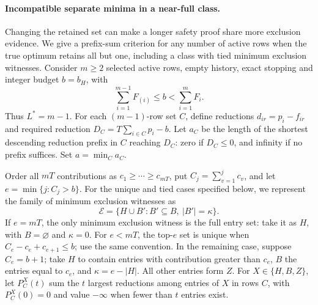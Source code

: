 \paragraph{Incompatible separate minima in a near-full class.}
Changing the retained set can make a longer safety proof share more exclusion evidence. We give a prefix-sum criterion for any number of active rows when the true optimum retains all but one, including a class with tied minimum exclusion witnesses. Consider $m\ge2$ selected active rows, empty history, exact stopping and integer budget $b=b_H$, with
\[
 \sum_{i=1}^{m-1}F_{(i)}\le b<\sum_{i=1}^m F_i.
\]
Thus $L^*=m-1$. For each $(m-1)$-row set $C$, define reductions $d_{ir}=p_i-f_{ir}$ and required reduction $D_C=T\sum_{i\in C}p_i-b$. Let $a_C$ be the length of the shortest descending reduction prefix in $C$ reaching $D_C$: zero if $D_C\le0$, and infinity if no prefix suffices. Set $a=\min_C a_C$.

Order all $mT$ contributions as $c_1\ge\cdots\ge c_{mT}$, put $C_j=\sum_{v=1}^jc_v$, and let $e=\min\{j:C_j>b\}$. For the unique and tied cases specified below, we represent the family of minimum exclusion witnesses as
\[
 \mathcal E=\{H\cup B':B'\subseteq B,\ |B'|=\kappa\}.
\]
If $e=mT$, the only minimum exclusion witness is the full entry set: take it as $H$, with $B=\varnothing$ and $\kappa=0$. For $e<mT$, the top-$e$ set is unique when $C_e-c_e+c_{e+1}\le b$; use the same convention. In the remaining case, suppose $C_e=b+1$; take $H$ to contain entries with contribution greater than $c_e$, $B$ the entries equal to $c_e$, and $\kappa=e-|H|$. All other entries form $Z$. For $X\in\{H,B,Z\}$, let $P_C^X(t)$ sum the $t$ largest reductions among entries of $X$ in rows $C$, with $P_C^X(0)=0$ and value $-\infty$ when fewer than $t$ entries exist.

